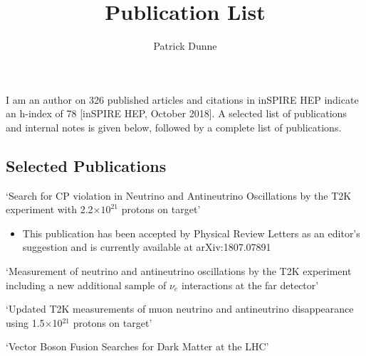 \documentclass[12pt]{article}   %
\title{Publication List}
\author{Patrick Dunne}
\date{}
\begin{document}
\maketitle
I am an author on 326 published articles and citations in inSPIRE HEP indicate an h-index of 78 [inSPIRE HEP, October 2018]. A selected list of publications and internal notes is given below, followed by a complete list of publications.
\vspace{-.5cm}
\subsection*{Selected Publications}
`Search for CP violation in Neutrino and Antineutrino Oscillations by the T2K experiment with 2.2$\times 10^{21}$ protons on target' \cite{oa2017prl}
\vspace{-.2cm}
\begin{itemize}
\item This publication has been accepted by Physical Review Letters as an editor's suggestion and is currently available at arXiv:1807.07891
\end{itemize}

`Measurement of neutrino and antineutrino oscillations by the T2K experiment including a new additional sample of $\nu_e$ interactions at the far detector'\cite{Abe:2017vif}

`Updated T2K measurements of muon neutrino and antineutrino disappearance using 1.5$\times$10$^{21}$ protons on target' \cite{Abe:2017bay}

`Vector Boson Fusion Searches for Dark Matter at the LHC' \cite{Brooke:2016vlw}
\end{document}
